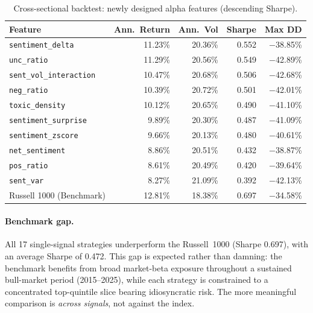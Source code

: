 \documentclass{article}
\begin{document}
\begin{table}[H]
\centering
\caption{Cross-sectional backtest: newly designed alpha features (descending Sharpe).}
\label{tab:backtest_alpha}
\begin{tabular}{lrrrr}
\toprule
\textbf{Feature} & \textbf{Ann.\ Return} & \textbf{Ann.\ Vol} & \textbf{Sharpe} & \textbf{Max DD} \\
\midrule
\texttt{sentiment\_delta}       & 11.23\% & 20.36\% & 0.552 & $-$38.85\% \\
\texttt{unc\_ratio}             & 11.29\% & 20.56\% & 0.549 & $-$42.89\% \\
\texttt{sent\_vol\_interaction} & 10.47\% & 20.68\% & 0.506 & $-$42.68\% \\
\texttt{neg\_ratio}             & 10.39\% & 20.72\% & 0.501 & $-$42.01\% \\
\texttt{toxic\_density}         & 10.12\% & 20.65\% & 0.490 & $-$41.10\% \\
\texttt{sentiment\_surprise}    & 9.89\%  & 20.30\% & 0.487 & $-$41.09\% \\
\texttt{sentiment\_zscore}      & 9.66\%  & 20.13\% & 0.480 & $-$40.61\% \\
\texttt{net\_sentiment}         & 8.86\%  & 20.51\% & 0.432 & $-$38.87\% \\
\texttt{pos\_ratio}             & 8.61\%  & 20.49\% & 0.420 & $-$39.64\% \\
\texttt{sent\_var}              & 8.27\%  & 21.09\% & 0.392 & $-$42.13\% \\
\midrule
Russell 1000 (Benchmark)        & 12.81\% & 18.38\% & 0.697 & $-$34.58\% \\
\bottomrule
\end{tabular}
\end{table}

\paragraph{Benchmark gap.}
All 17 single-signal strategies underperform the Russell~1000 (Sharpe 0.697), with an average Sharpe of 0.472. This gap is expected rather than damning: the benchmark benefits from broad market-beta exposure throughout a sustained bull-market period (2015--2025), while each strategy is constrained to a concentrated top-quintile slice bearing idiosyncratic risk. The more meaningful comparison is \emph{across signals}, not against the index.
\end{document}
